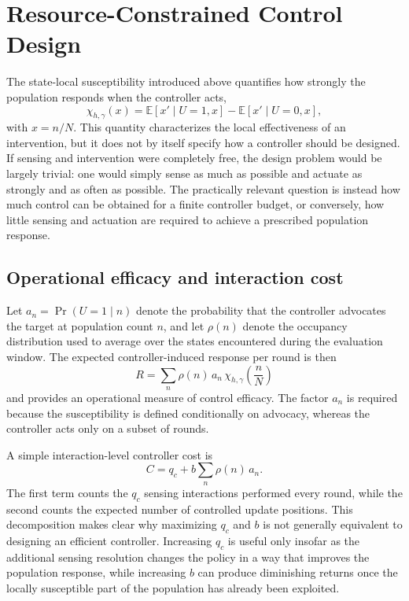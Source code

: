\section{Resource-Constrained Control Design}
\label{sec:resource_constrained_control}

The state-local susceptibility introduced above quantifies how strongly the population responds when the controller acts,
\begin{equation}
\chi_{h,\gamma}(x)
=
\mathbb{E}[x' \mid U=1,x]
-
\mathbb{E}[x' \mid U=0,x],
\end{equation}
with \(x=n/N\). This quantity characterizes the local effectiveness of an intervention, but it does not by itself specify how a controller should be designed. If sensing and intervention were completely free, the design problem would be largely trivial: one would simply sense as much as possible and actuate as strongly and as often as possible. The practically relevant question is instead how much control can be obtained for a finite controller budget, or conversely, how little sensing and actuation are required to achieve a prescribed population response.

\subsection{Operational efficacy and interaction cost}
\label{subsec:efficacy_cost}

Let \(a_n=\Pr(U=1\mid n)\) denote the probability that the controller advocates the target at population count \(n\), and let \(\rho(n)\) denote the occupancy distribution used to average over the states encountered during the evaluation window. The expected controller-induced response per round is then
\begin{equation}
\boxed{
R
=
\sum_n
\rho(n)\,
a_n\,
\chi_{h,\gamma}\!\left(\frac{n}{N}\right)
}
\label{eq:control_efficacy}
\end{equation}
and provides an operational measure of control efficacy. The factor \(a_n\) is required because the susceptibility is defined conditionally on advocacy, whereas the controller acts only on a subset of rounds.

A simple interaction-level controller cost is
\begin{equation}
\boxed{
C
=
q_c
+
b
\sum_n
\rho(n)\,a_n .
}
\label{eq:control_cost}
\end{equation}
The first term counts the \(q_c\) sensing interactions performed every round, while the second counts the expected number of controlled update positions. This decomposition makes clear why maximizing \(q_c\) and \(b\) is not generally equivalent to designing an efficient controller. Increasing \(q_c\) is useful only insofar as the additional sensing resolution changes the policy in a way that improves the population response, while increasing \(b\) can produce diminishing returns once the locally susceptible part of the population has already been exploited.

